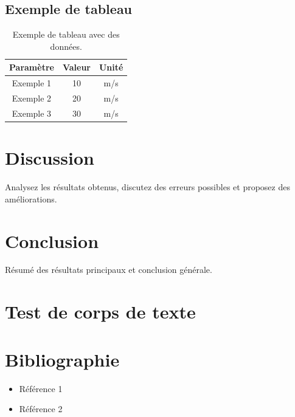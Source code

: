 \documentclass[a4paper,12pt]{article}
\begin{document}
\subsection{Exemple de tableau}
\begin{table}[h!]
	\centering
	\begin{tabular}{|c|c|c|}
		\hline
		\textbf{Paramètre} & \textbf{Valeur} & \textbf{Unité} \\
		\hline
		Exemple 1          & 10              & m/s            \\
		Exemple 2          & 20              & m/s            \\
		Exemple 3          & 30              & m/s            \\
		\hline
	\end{tabular}
	\caption{Exemple de tableau avec des données.}
	\label{tab:exemple_tableau}
\end{table}

\section{Discussion}
Analysez les résultats obtenus, discutez des erreurs possibles et proposez des améliorations.

\section{Conclusion}
Résumé des résultats principaux et conclusion générale.

\section{Test de corps de texte}
\lipsum[1-3] %

\section*{Bibliographie}
\begin{itemize}
	\item Référence 1
	\item Référence 2
\end{itemize}
\end{document}
